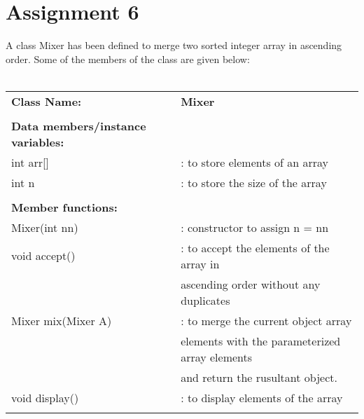 \section*{\centering Assignment 6}
\vspace{15px}
A class Mixer has been defined to merge two sorted integer array in ascending 
order. Some of the members of the class are given below: \\\\
\begin{tabular}{l l}
	\textbf{Class Name:} & \textbf{Mixer} \\\\
	\textbf{Data members/instance variables:} & \\
	int arr[] & : to store elements of an array \\
	int n & : to store the size of the array \\\\
	\textbf{Member functions:} & \\
	Mixer(int nn) & : constructor to assign n = nn \\ 
	void accept() & : to accept the elements of the array in\\
	&ascending order without any duplicates \\
	Mixer mix(Mixer A) & : to merge the current object array\\
	&elements with the parameterized array elements \\
	&and return the rusultant object.\\
	void display() & : to display elements of the array \\\\

\end{tabular}

